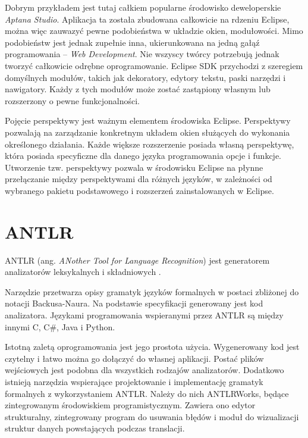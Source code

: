 Dobrym przykładem jest tutaj całkiem popularne środowisko deweloperskie \emph{Aptana Studio}. Aplikacja ta została zbudowana całkowicie na rdzeniu Eclipse, można więc zauwazyć pewne podobieństwa w układzie okien, modułowości. Mimo podobieństw jest jednak zupełnie inna, ukierunkowana na jedną gałąź programowania – \emph{Web Development}. Nie wszyscy twórcy potrzebują jednak tworzyć całkowicie odrębne oprogramowanie. Eclipse SDK przychodzi z szeregiem domyślnych modułów, takich jak dekoratory, edytory tekstu, paski narzędzi i nawigatory. Każdy z tych modułów może zostać zastąpiony własnym lub rozszerzony o pewne funkcjonalności.

Pojęcie perspektywy jest ważnym elementem środowiska Eclipse. Perspektywy pozwalają na zarządzanie konkretnym układem okien służących do wykonania określonego działania. Każde większe rozszerzenie posiada własną perspektywę, która posiada specyficzne dla danego języka programowania opcje i funkcje. Utworzenie tzw. perspektywy pozwala w środowisku Eclipse na płynne przełączanie między perspektywami dla różnych języków, w zależności od wybranego pakietu podstawowego i rozszerzeń zainstalowanych w Eclipse.

\section{ANTLR}
ANTLR (ang. \emph{ANother Tool for Language Recognition}) jest generatorem
analizatorów leksykalnych i składniowych \cite{antlr}.

Narzędzie przetwarza opisy gramatyk języków formalnych w postaci 
zbliżonej do notacji
 Backusa-Naura. Na podstawie specyfikacji generowany jest kod analizatora.
Językami programowania wspieranymi przez ANTLR są między innymi C, C\#, Java
i Python.

Istotną zaletą oprogramowania jest jego prostota użycia. Wygenerowany kod 
jest czytelny i  łatwo można go dołączyć do własnej aplikacji. Postać plików
wejściowych jest podobna dla wszystkich rodzajów analizatorów. Dodatkowo
istnieją narzędzia wspierające projektowanie i implementację gramatyk
formalnych z wykorzystaniem ANTLR. Należy do nich ANTLRWorks, będące
zintegrowanym środowiskiem programistycznym. Zawiera ono edytor strukturalny,
zintegrowany program do usuwania błędów i moduł do wizualizacji struktur 
danych powstających podczas translacji.

